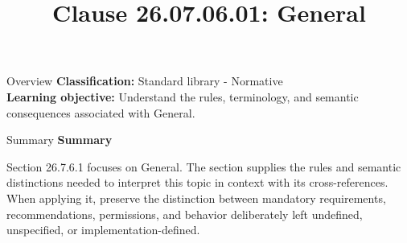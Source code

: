\documentclass[10pt,letterpaper]{article}
\title{Clause 26.07.06.01: General}
\author{}
\date{}
\begin{document}
\maketitle
\begin{CornellOverviewBox}{Overview}
\textbf{Classification:} Standard library - Normative\\[2pt]
\textbf{Learning objective:} Understand the rules, terminology, and semantic consequences associated with General.
\end{CornellOverviewBox}\begin{CornellSummaryBox}{Summary}
{\sffamily\bfseries\color{Accent} Summary}\par\vspace{3pt}Section 26.7.6.1 focuses on General. The section supplies the rules and semantic distinctions needed to interpret this topic in context with its cross-references. When applying it, preserve the distinction between mandatory requirements, recommendations, permissions, and behavior deliberately left undefined, unspecified, or implementation-defined.
\end{CornellSummaryBox}
\end{document}
